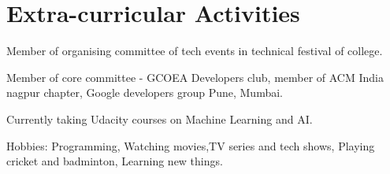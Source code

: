 \documentclass[]{deedy-resume-openfont}
\begin{document}
\begin{minipage}[t]{0.66\textwidth}


\section{Extra-curricular Activities} 
\vspace{3mm}
\begin{tightemize}
 \item Member of organising committee of tech events in technical festival of college.
 \item Member of core committee - GCOEA Developers club, member of ACM India nagpur chapter, Google developers group Pune, Mumbai.
 \item Currently taking Udacity courses on Machine Learning and AI.
 \item Hobbies: Programming, Watching movies,TV series and tech shows, Playing cricket and badminton,
Learning new things.
\end{tightemize}

\sectionsep

\end{minipage} 
\end{document}
